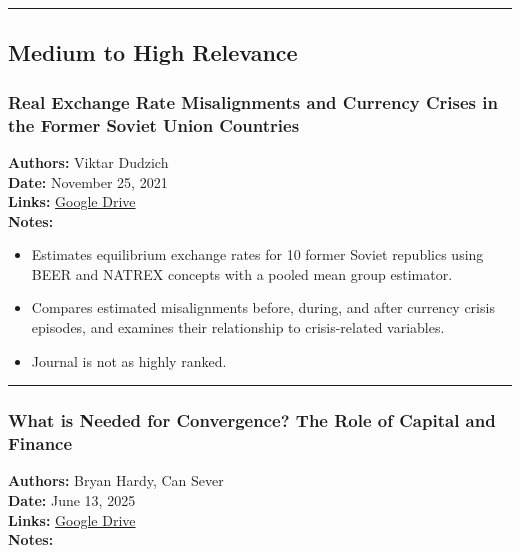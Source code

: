 \documentclass[
  11pt,
]{article}
\providecommand{\tightlist}{%
  \setlength{\itemsep}{0pt}\setlength{\parskip}{0pt}}
\begin{document}
\begin{center}\rule{0.5\linewidth}{0.5pt}\end{center}

\subsection{Medium to High Relevance}\label{medium-to-high-relevance}

\subsubsection{Real Exchange Rate Misalignments and Currency Crises in
the Former Soviet Union
Countries}\label{real-exchange-rate-misalignments-and-currency-crises-in-the-former-soviet-union-countries}

\textbf{Authors:} Viktar Dudzich\\
\textbf{Date:} November 25, 2021\\
\textbf{Links:}
\href{https://drive.google.com/file/d/1O9A9N2GmYd0LRPhnE3LdUbVbDA0hd6zk/view?usp=sharing}{Google
Drive}\\
\textbf{Notes:}

\begin{itemize}
\tightlist
\item
  Estimates equilibrium exchange rates for 10 former Soviet republics
  using BEER and NATREX concepts with a pooled mean group estimator.
\item
  Compares estimated misalignments before, during, and after currency
  crisis episodes, and examines their relationship to crisis-related
  variables.
\item
  Journal is not as highly ranked.
\end{itemize}

\begin{center}\rule{0.5\linewidth}{0.5pt}\end{center}

\subsubsection{What is Needed for Convergence? The Role of Capital and
Finance}\label{what-is-needed-for-convergence-the-role-of-capital-and-finance}

\textbf{Authors:} Bryan Hardy, Can Sever\\
\textbf{Date:} June 13, 2025\\
\textbf{Links:}
\href{https://drive.google.com/file/d/1UEEN58-yuPErOCtVsMKjYnqeX62k0BU4/view?usp=sharing}{Google
Drive}\\
\textbf{Notes:}
\end{document}
